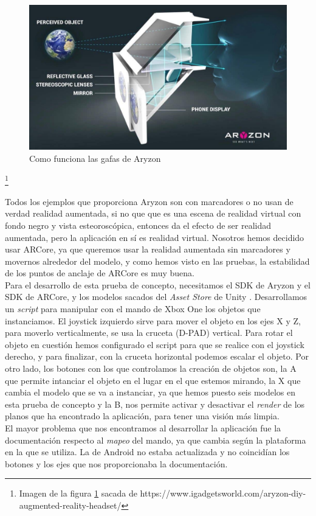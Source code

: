 \begin{figure}[H]
    \centering
    \includegraphics[width=0.5\linewidth]{Images/How-it-works.jpg}
    \caption{Como funciona las gafas de Aryzon}
    \label{GafasAryzon}
\end{figure}
 {\let\thefootnote\relax\footnote{{Imagen de la figura \ref{GafasAryzon} sacada de https://www.igadgetsworld.com/aryzon-diy-augmented-reality-headset/}}}

Todos los ejemplos que proporciona Aryzon son con marcadores o no usan de verdad realidad aumentada, si no que que es una escena de realidad virtual con fondo negro y vista esteoroscópica, entonces da el efecto de ser realidad aumentada, pero la aplicación en sí es realidad virtual. Nosotros hemos decidido usar ARCore, ya que queremos usar la realidad aumentada sin marcadores y movernos alrededor del modelo, y como hemos visto en las pruebas, la estabilidad de los puntos de anclaje de ARCore es muy buena.\\
Para el desarrollo de esta prueba de concepto, necesitamos el SDK de Aryzon y el SDK de ARCore, y los modelos sacados del \textit{Asset Store} de Unity \cite{AssetStore}. Desarrollamos un \textit{script} para manipular con el mando de Xbox One los objetos que instanciamos. El joystick izquierdo sirve para mover el objeto en los ejes X y Z, para moverlo verticalmente, se usa la cruceta (D-PAD) vertical. Para rotar el objeto en cuestión hemos configurado el script para que se realice con el joystick derecho, y para finalizar, con la cruceta horizontal podemos escalar el objeto. Por otro lado, los botones con los que controlamos la creación de objetos son, la A que permite intanciar el objeto en el lugar en el que estemos mirando, la X que cambia el modelo que se va a instanciar, ya que hemos puesto seis modelos en esta prueba de concepto y la B, nos permite activar y desactivar el \textit{render} de los planos que ha encontrado la aplicación, para tener una visión más limpia.\\
El mayor problema que nos encontramos al desarrollar la aplicación fue la documentación respecto al \textit{mapeo} del mando, ya que cambia según la plataforma en la que se utiliza. La de Android no estaba actualizada y no coincidían los botones y los ejes que nos proporcionaba la documentación.\\
